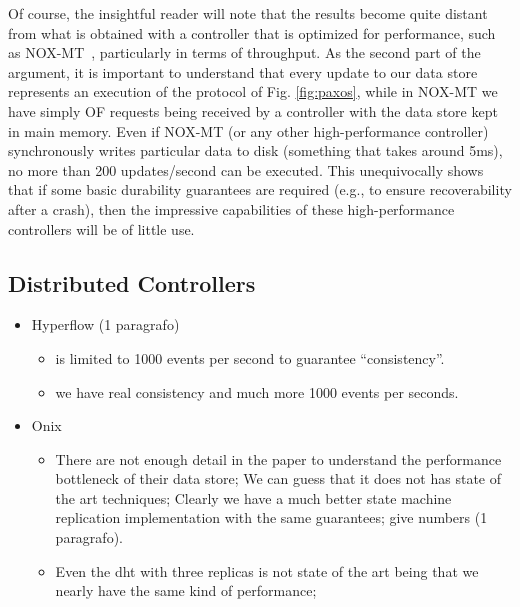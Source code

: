 Of course, the insightful reader will note that the results become quite distant from what is obtained with a controller that is optimized for performance, such as NOX-MT~\cite{Tootoonchian:2012:CPS:2228283.2228297}, particularly in terms of throughput.
As the second part of the argument, it is important to understand that every update to our data store represents an execution of the protocol of Fig. \ref{fig:paxos}, while in NOX-MT we have simply OF requests being received by a controller with the data store kept in main memory.
Even if NOX-MT (or any other high-performance controller) synchronously writes particular data to disk (something that takes around 5ms), no more than 200 updates/second can be executed.
This unequivocally shows that if some basic durability guarantees are required (e.g., to ensure recoverability after a crash), then the impressive capabilities of these high-performance controllers will be of little use.

\subsection{Distributed Controllers}
\begin{itemize}
\item Hyperflow (1 paragrafo) 
  \begin{itemize}
  \item  is limited to 1000 events per second to guarantee ``consistency''.  
  \item  we have real consistency and much more 1000 events per seconds.
  \end{itemize}
\item Onix
  \begin{itemize}
  \item  There are not enough detail in the paper to understand the performance bottleneck of their data store;  We can guess that it does not has state of the art techniques; Clearly we have a much better state machine replication implementation with the same guarantees; give numbers (1 paragrafo).
\item  Even the dht with three replicas is not state of the art being that we nearly have the same kind of performance; 
  \end{itemize}
\end{itemize}


